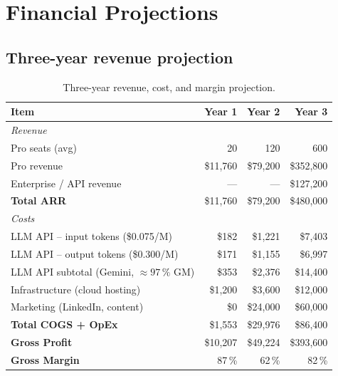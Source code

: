 \documentclass[11pt, a4paper, oneside]{report}
\begin{document}
\chapter{Financial Projections}
\label{ch:finance}

\section{Three-year revenue projection}

\begin{table}[H]
\centering\small
\caption{Three-year revenue, cost, and margin projection.}
\begin{tabularx}{\textwidth}{X r r r}
\toprule
\textbf{Item}                    & \textbf{Year 1} & \textbf{Year 2} & \textbf{Year 3} \\
\midrule
\multicolumn{4}{l}{\textit{Revenue}} \\
Pro seats (avg)                  & 20              & 120             & 600 \\
Pro revenue                      & \$11{,}760      & \$79{,}200      & \$352{,}800 \\
Enterprise / API revenue         & ---             & ---             & \$127{,}200 \\
\textbf{Total ARR}               & \$11{,}760      & \$79{,}200      & \$480{,}000 \\
\midrule
\multicolumn{4}{l}{\textit{Costs}} \\
LLM API -- input tokens  (\$0.075/M) & \$182         & \$1{,}221       & \$7{,}403  \\
LLM API -- output tokens (\$0.300/M) & \$171         & \$1{,}155       & \$6{,}997  \\
LLM API subtotal (Gemini, $\approx 97\,\%$ GM) & \$353         & \$2{,}376       & \$14{,}400 \\
Infrastructure (cloud hosting)   & \$1{,}200       & \$3{,}600       & \$12{,}000 \\
Marketing (LinkedIn, content)    & \$0             & \$24{,}000      & \$60{,}000 \\
\textbf{Total COGS + OpEx}       & \$1{,}553       & \$29{,}976      & \$86{,}400 \\
\midrule
\textbf{Gross Profit}            & \$10{,}207      & \$49{,}224      & \$393{,}600 \\
\textbf{Gross Margin}            & 87\,\%          & 62\,\%          & 82\,\% \\
\bottomrule
\end{tabularx}
\end{table}
\end{document}
